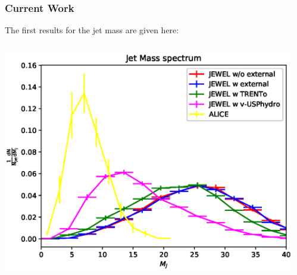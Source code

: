 \documentclass{beamer}
\begin{document}
\begin{frame}\frametitle{Current Work}
	\begin{minipage}{1\textwidth}
	The first results for the jet mass are given here:
    \end{minipage}
    \begin{columns}
    \begin{column}{0.5\textwidth}
	\begin{minipage}[l]{0.5\textwidth}
	\includegraphics[scale=0.4]{images/Mass.eps}
	\end{minipage}
	\end{column}
    \begin{column}{0.4\textwidth}
	\begin{minipage}[r]{1\textwidth}
	
	\end{minipage}
	\end{column}
	\end{columns}
\end{frame}
\end{document}
